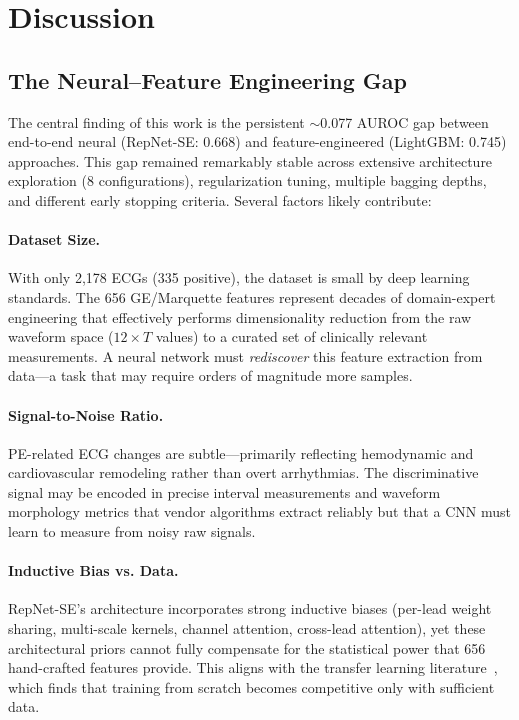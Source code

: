 \documentclass[11pt,a4paper]{article}
\begin{document}
\section{Discussion}
\label{sec:discussion}

\subsection{The Neural--Feature Engineering Gap}

The central finding of this work is the persistent $\sim$0.077 AUROC gap between end-to-end neural (RepNet-SE: 0.668) and feature-engineered (LightGBM: 0.745) approaches. This gap remained remarkably stable across extensive architecture exploration (8 configurations), regularization tuning, multiple bagging depths, and different early stopping criteria. Several factors likely contribute:

\paragraph{Dataset Size.}
With only 2,178 ECGs (335 positive), the dataset is small by deep learning standards. The 656 GE/Marquette features represent decades of domain-expert engineering that effectively performs dimensionality reduction from the raw waveform space ($12 \times T$ values) to a curated set of clinically relevant measurements. A neural network must \emph{rediscover} this feature extraction from data---a task that may require orders of magnitude more samples.

\paragraph{Signal-to-Noise Ratio.}
PE-related ECG changes are subtle---primarily reflecting hemodynamic and cardiovascular remodeling rather than overt arrhythmias. The discriminative signal may be encoded in precise interval measurements and waveform morphology metrics that vendor algorithms extract reliably but that a CNN must learn to measure from noisy raw signals.

\paragraph{Inductive Bias vs. Data.}
RepNet-SE's architecture incorporates strong inductive biases (per-lead weight sharing, multi-scale kernels, channel attention, cross-lead attention), yet these architectural priors cannot fully compensate for the statistical power that 656 hand-crafted features provide. This aligns with the transfer learning literature~\cite{transferecg2024}, which finds that training from scratch becomes competitive only with sufficient data.
\end{document}

